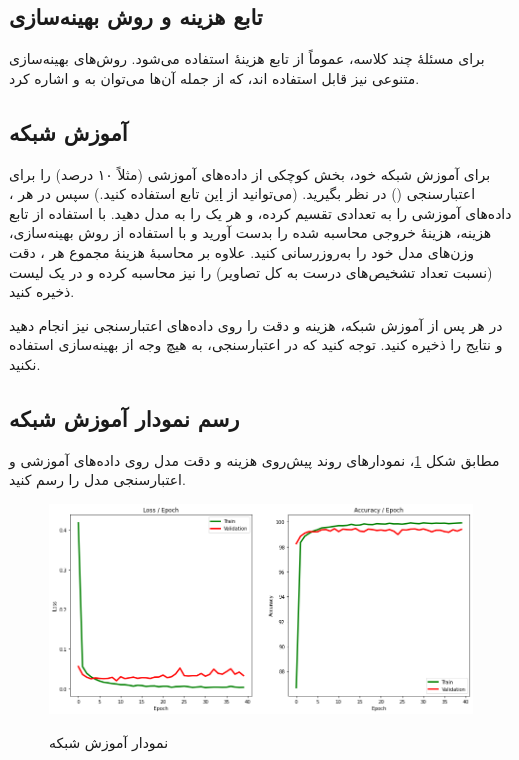 \documentclass{article}
\begin{document}
\subsection*{تابع هزینه و روش بهینه‌سازی}

برای مسئلهٔ
چند کلاسه، عموماً از تابع هزینهٔ
\hyperref{https://pytorch.org/docs/master/generated/torch.nn.functional.cross_entropy.html}{}{}{}
استفاده می‌شود. روش‌های بهینه‌سازی متنوعی نیز قابل استفاده اند، که از جمله آن‌ها می‌توان به
\hyperref{https://pytorch.org/docs/master/generated/torch.optim.Adam.html}{}{}{}
و
\hyperref{https://pytorch.org/docs/master/generated/torch.optim.SGD.html}{}{}{}
اشاره کرد.

\subsection*{آموزش شبکه}

برای آموزش شبکه خود، بخش کوچکی از داده‌های آموزشی (مثلاً ۱۰ درصد) را برای اعتبارسنجی
()
در نظر بگیرید. (می‌توانید از
\hyperref{https://scikit-learn.org/stable/modules/generated/sklearn.model_selection.train_test_split.html}{}{}{این}
تابع استفاده کنید.) سپس در هر
،
داده‌های آموزشی را به تعدادی
تقسیم کرده، و هر یک را به مدل دهید. با استفاده از تابع هزینه، هزینهٔ خروجی محاسبه شده را بدست آورید و با استفاده از روش بهینه‌سازی، وزن‌های مدل خود را به‌روزرسانی کنید. علاوه بر محاسبهٔ هزینهٔ مجموع هر
،
دقت (نسبت تعداد تشخیص‌های درست به کل تصاویر) را نیز محاسبه کرده و در یک لیست ذخیره کنید.

در هر
پس از آموزش شبکه، هزینه و دقت را روی داده‌های اعتبارسنجی نیز انجام دهید و نتایج را ذخیره کنید. توجه کنید که در اعتبارسنجی، به هیچ وجه از بهینه‌سازی استفاده نکنید.

\subsection*{رسم نمودار آموزش شبکه}

مطابق شکل
\ref{fig:TrainingCurve}،
نمودارهای روند پیش‌روی هزینه و دقت مدل روی داده‌های آموزشی و اعتبارسنجی مدل را رسم کنید.

\begin{figure}[ht]
	\begin{center}
		\includegraphics[width=\linewidth]{images/TrainingCurve.png}
		\label{fig:TrainingCurve}
		\caption{نمودار آموزش شبکه}
	\end{center}
\end{figure}
\end{document}
